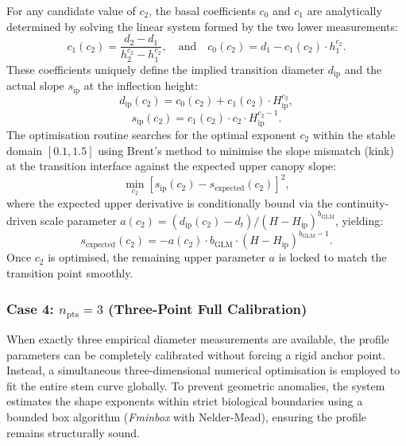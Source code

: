 \documentclass[twocolumn, bibliography=totoc]{scrartcl}
\begin{document}
For any candidate value of $c_2$, the basal coefficients $c_0$ and $c_1$ are analytically determined by solving the linear system formed by the two lower measurements:
\begin{equation}
    c_1(c_2) = \frac{d_2 - d_1}{h_2^{c_2} - h_1^{c_2}},
    \quad \text{and} \quad c_0(c_2) = d_1 - c_1(c_2) \cdot h_1^{c_2}.
\end{equation}
These coefficients uniquely define the implied transition diameter $d_{\text{ip}}$ and the actual slope $s_{\text{ip}}$ at the inflection height:
\begin{equation}
    d_{\text{ip}}(c_2) = c_0(c_2) + c_1(c_2) \cdot H_{\text{ip}}^{c_2},
\end{equation}
\begin{equation}
    s_{\text{ip}}(c_2) = c_1(c_2) \cdot c_2 \cdot H_{\text{ip}}^{c_2-1}.
\end{equation}
The optimisation routine searches for the optimal exponent $c_2$ within the stable domain $[0.1, 1.5]$ using Brent's method to minimise the slope mismatch (kink) at the transition interface against the expected upper canopy slope:
\begin{equation}
    \min_{c_2} \left[ s_{\text{ip}}(c_2) - s_{\text{expected}}(c_2) \right]^2,
\end{equation}
where the expected upper derivative is conditionally bound via the continuity-driven scale parameter $a(c_2) = (d_{\text{ip}}(c_2) - d_t) / (H - H_{\text{ip}})^{b_{\text{GLM}}}$, yielding:
\begin{equation}
    s_{\text{expected}}(c_2) = -a(c_2) \cdot b_{\text{GLM}} \cdot (H - H_{\text{ip}})^{b_{\text{GLM}}-1}.
\end{equation}
Once $c_2$ is optimised, the remaining upper parameter $a$ is locked to match the transition point smoothly.


\subsubsection{Case 4: $n_{\text{pts}} = 3$ (Three-Point Full Calibration)}
When exactly three empirical diameter measurements are available, the profile parameters can be completely calibrated without forcing a rigid anchor point. Instead, a simultaneous three-dimensional numerical optimisation is employed to fit the entire stem curve globally. To prevent geometric anomalies, the system estimates the shape exponents within strict biological boundaries using a bounded box algorithm (\textit{Fminbox} with Nelder-Mead), ensuring the profile remains structurally sound.
\end{document}
